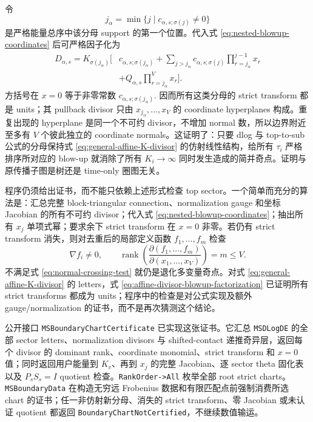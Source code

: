 \documentclass[11pt,a4paper]{ctexart}
\begin{document}
令
\begin{equation}
 j_\alpha=\min\{j\mid c_{\alpha,s;\sigma(j)}\neq0\}
\end{equation}
是严格能量总序中该分母 support 的第一个位置。代入式 \eqref{eq:nested-blowup-coordinates} 后可严格因子化为
\begin{equation}
 \begin{split}
 D_{\alpha,s}
 =K_{\sigma(j_\alpha)}\Bigg[&c_{\alpha,s;\sigma(j_\alpha)}
 +\sum_{j>j_\alpha}c_{\alpha,s;\sigma(j)}
   \prod_{r=j_\alpha}^{j-1}x_r\\
 &+Q_{\alpha,s}\prod_{r=j_\alpha}^{V}x_r\Bigg].
 \end{split}
 \label{eq:affine-divisor-blowup-factorization}
\end{equation}
方括号在 $x=0$ 等于非零常数 $c_{\alpha,s;\sigma(j_\alpha)}$. 因而所有这类分母的 strict transform 都是 units；其 pullback divisor 只由 $x_{j_\alpha},\ldots,x_V$ 的 coordinate hyperplanes 构成。重复出现的 hyperplane 是同一个不可约 divisor，不增加 normal 数，所以边界附近至多有 $V$ 个彼此独立的 coordinate normals。这证明了：只要 dlog 与 top-to-sub 公式的分母保持式 \eqref{eq:general-affine-K-divisor} 的仿射线性结构，给所有 $\tau_i$ 严格排序所对应的 blow-up 就消除了所有 $K_i\to\infty$ 同时发生造成的简并奇点。证明与原传播子图是树还是 time-only 圈图无关。

程序仍须给出证书，而不能只依赖上述形式检查 top sector。一个简单而充分的算法是：汇总完整 block-triangular connection、normalization gauge 和坐标 Jacobian 的所有不可约 divisor；代入式 \eqref{eq:nested-blowup-coordinates}；抽出所有 $x_j$ 单项式幂；要求余下 strict transform 在 $x=0$ 非零。若仍有 strict transform 消失，则对去重后的局部定义函数 $f_1,\ldots,f_m$ 检查
\begin{equation}
 \nabla f_i\neq0,
 \qquad
 \operatorname{rank}\!\left(\frac{\partial(f_1,\ldots,f_m)}
 {\partial(x_1,\ldots,x_V)}\right)=m\leq V.
 \label{eq:normal-crossing-test}
\end{equation}
不满足式 \eqref{eq:normal-crossing-test} 就仍是退化多变量奇点。对式 \eqref{eq:general-affine-K-divisor} 的 letters，式 \eqref{eq:affine-divisor-blowup-factorization} 已证明所有 strict transforms 都成为 units；程序中的检查是对公式实现及额外 gauge/normalization 的证书，而不是再次猜测这个结论。

公开接口 \texttt{MSBoundaryChartCertificate} 已实现这张证书。它汇总 \texttt{MSDLogDE} 的全部 sector letters、normalization divisors 与 shifted-contact 递推奇异层，返回每个 divisor 的 dominant rank、coordinate monomial、strict transform 和 $x=0$ 值；同时返回用户能量到 $K_v$、再到 $x_j$ 的完整 Jacobian、逐 sector theta 固化表以及 $P_sS_s=I$ quotient 检查。\texttt{RankOrder->All} 枚举全部 root strict charts。\texttt{MSBoundaryData} 在构造无穷远 Frobenius 数据和有限匹配点前强制消费所选 chart 的证书；任一非仿射新分母、消失的 strict transform、零 Jacobian 或未认证 quotient 都返回 \texttt{BoundaryChartNotCertified}，不继续数值输运。
\end{document}
